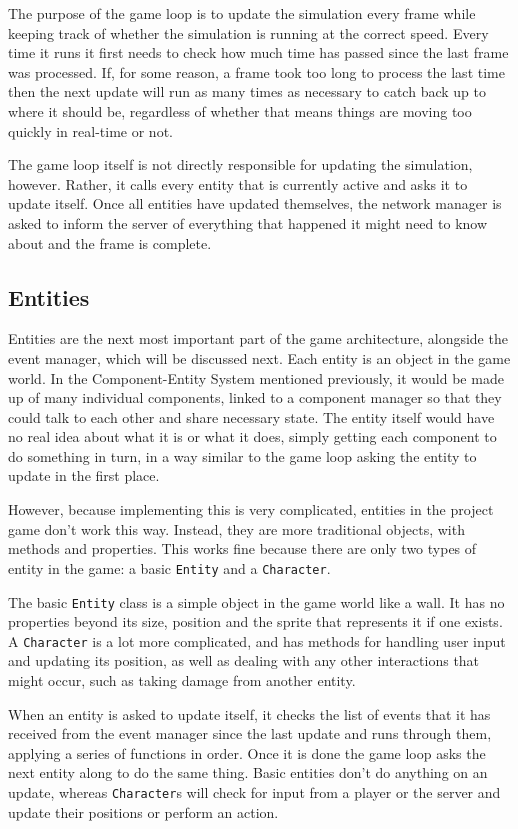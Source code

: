 The purpose of the game loop is to update the simulation every frame while keeping track of whether the simulation is running at the correct speed. Every time it runs it first needs to check how much time has passed since the last frame was processed. If, for some reason, a frame took too long to process the last time then the next update will run as many times as necessary to catch back up to where it should be, regardless of whether that means things are moving too quickly in real-time or not.

The game loop itself is not directly responsible for updating the simulation, however. Rather, it calls every entity that is currently active and asks it to update itself. Once all entities have updated themselves, the network manager is asked to inform the server of everything that happened it might need to know about and the frame is complete.

\subsection{Entities}\label{entities_design}
Entities are the next most important part of the game architecture, alongside the event manager, which will be discussed next. Each entity is an object in the game world. In the Component-Entity System mentioned previously, it would be made up of many individual components, linked to a component manager so that they could talk to each other and share necessary state. The entity itself would have no real idea about what it is or what it does, simply getting each component to do something in turn, in a way similar to the game loop asking the entity to update in the first place.

However, because implementing this is very complicated, entities in the project game don't work this way. Instead, they are more traditional objects, with methods and properties. This works fine because there are only two types of entity in the game: a basic \texttt{Entity} and a \texttt{Character}.

The basic \texttt{Entity} class is a simple object in the game world like a wall. It has no properties beyond its size, position and the sprite that represents it if one exists. A \texttt{Character} is a lot more complicated, and has methods for handling user input and updating its position, as well as dealing with any other interactions that might occur, such as taking damage from another entity.

When an entity is asked to update itself, it checks the list of events that it has received from the event manager since the last update and runs through them, applying a series of functions in order. Once it is done the game loop asks the next entity along to do the same thing. Basic entities don't do anything on an update, whereas \texttt{Character}s will check for input from a player or the server and update their positions or perform an action.


